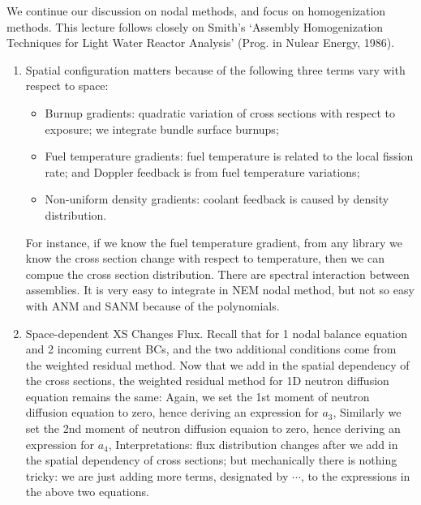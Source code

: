 \documentclass{school-22.211-notes}
\date{May  7, 2012}
\begin{document}
\maketitle

We continue our discussion on nodal methods, and focus on homogenization methods. This lecture follows closely on Smith's `Assembly Homogenization Techniques for Light Water Reactor Analysis' (Prog. in Nulear Energy, 1986). 

\begin{enumerate}
\item Spatial configuration matters because of the following three terms vary with respect to space:
\begin{itemize}
\item Burnup gradients: quadratic variation of cross sections with respect to exposure; we integrate bundle surface burnups;
\item Fuel temperature gradients: fuel temperature is related to the local fission rate; and Doppler feedback is from fuel temperature variations;
\item Non-uniform density gradients: coolant feedback is caused by density distribution.
\end{itemize}
For instance, if we know the fuel temperature gradient, from any library we know the cross section change with respect to temperature, then we can compue the cross section distribution.  There are spectral interaction between assemblies. It is very easy to integrate in NEM nodal method, but not so easy with ANM and SANM because of the polynomials. 

\item Space-dependent XS Changes Flux. Recall that for 1 nodal balance equation and 2 incoming current BCs, and the two additional conditions come from the weighted residual method. Now that we add in the spatial dependency of the cross sections, the weighted residual method for 1D neutron diffusion equation remains the same: 
Again, we set the 1st moment of neutron diffusion equation to zero, hence deriving an expression for $a_3$, 
Similarly we set the 2nd moment of neutron diffusion equaion to zero, hence deriving an expression for $a_4$, 
Interpretations: flux distribution changes after we add in the spatial dependency of cross sections; but mechanically there is nothing tricky: we are just adding more terms, designated by $\cdots$, to the expressions in the above two equations. 


\end{enumerate}
\end{document}
